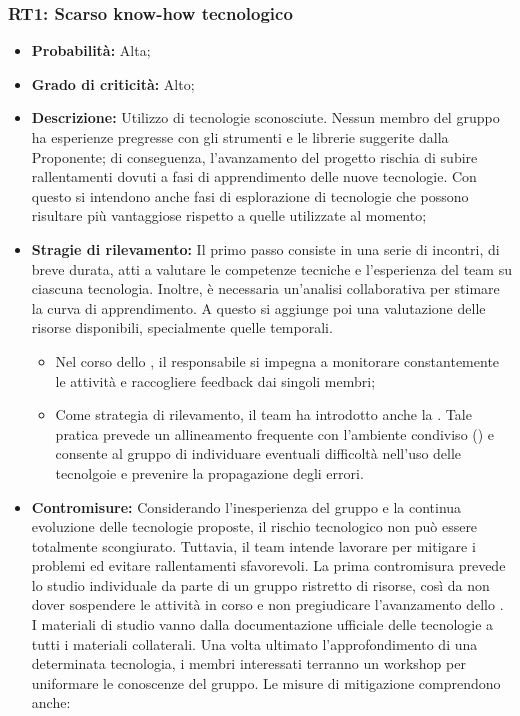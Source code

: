 \subsubsection{RT1: Scarso know-how tecnologico}
\begin{itemize}
    \item \textbf{Probabilità:} Alta;
    \item \textbf{Grado di criticità:} Alto;
    \item \textbf{Descrizione:} Utilizzo di tecnologie sconosciute. Nessun membro del gruppo ha
    esperienze pregresse con gli strumenti e le librerie suggerite dalla Proponente; di conseguenza, l’avanzamento del progetto rischia di subire rallentamenti dovuti a fasi di apprendimento delle nuove tecnologie.
    Con questo si intendono anche fasi di esplorazione di tecnologie che possono risultare più vantaggiose rispetto a quelle utilizzate al momento;
    \item \textbf{Stragie di rilevamento:} Il primo passo consiste in una serie di incontri, di breve durata, atti a valutare le competenze tecniche e l'esperienza del team su ciascuna tecnologia. Inoltre, è necessaria un'analisi collaborativa per stimare la curva di apprendimento. A questo si aggiunge poi una valutazione delle risorse disponibili, specialmente quelle temporali.
    \begin{itemize}
        \item Nel corso dello , il responsabile si impegna a monitorare constantemente le attività e raccogliere feedback dai singoli membri;
        \item Come strategia di rilevamento, il team ha introdotto anche la . Tale pratica prevede un allineamento frequente con l'ambiente condiviso () e consente al gruppo di individuare eventuali difficoltà nell'uso delle tecnolgoie e prevenire la propagazione degli errori. 
    \end{itemize}
    \item \textbf{Contromisure:} Considerando l'inesperienza del gruppo e la continua evoluzione delle tecnologie proposte, il rischio tecnologico non può essere totalmente scongiurato. Tuttavia, il team intende lavorare per mitigare i problemi ed evitare rallentamenti sfavorevoli. La prima contromisura prevede lo studio individuale da parte di un gruppo ristretto di risorse, così da non dover sospendere le attività in corso e non pregiudicare l'avanzamento dello . I materiali di studio vanno dalla documentazione ufficiale delle tecnologie a tutti i materiali collaterali. Una volta ultimato l'approfondimento di una determinata tecnologia, i membri interessati terranno un workshop per uniformare le conoscenze del gruppo. Le misure di mitigazione comprendono anche:

\end{itemize}
